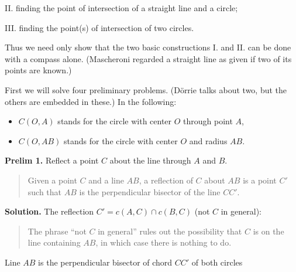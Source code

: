 II. finding the point of intersection of a straight line and a circle;

III. finding the point(s) of intersection of two circles.

Thus we need only show that the two basic constructions I. and II. can be done with a compass alone. (Mascheroni regarded a straight line as given if two of its points are known.)

First we will solve four preliminary problems. (Dörrie talks about two, but the others are embedded in these.) In the following:
\begin{itemize}
\item $C(O,A)$ stands for the circle with center $O$ through point $A$,
\item $C(O,AB)$ stands for the circle with center $O$ and radius $AB$.
\end{itemize}


\pagebreak[3]

\textbf{Prelim 1.} Reflect a point $C$ about the line through $A$ and $B$.

\begin{quote}
Given a point $C$ and a line $AB$, a reflection of $C$ about $AB$ is a point $C'$ such that $AB$ is the perpendicular bisector of the line $CC'$.
\end{quote}

\textbf{Solution.} The reflection $C'=c(A,C) \cap c(B,C)$ (not $C$ in general):

\begin{quote}
The phrase ``not $C$ in general'' rules out the possibility that $C$ is on the line containing $AB$, in which case there is nothing to do.
\end{quote}

\begin{center}

Line $AB$ is the perpendicular bisector of chord $CC'$ of both circles
\end{center}

